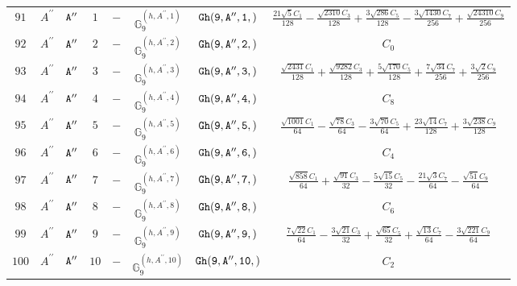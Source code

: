 \documentclass[fleqn,8pt]{jsarticle}
\begin{document}
\begin{table}[ht!]
\begin{center}
\begin{tabular}{cccccccc}
$ 91 $ & $ A^{\prime\prime} $ & $ {\tt A''} $ & $ 1 $ & $ - $ & $ \mathbb{G}_{9}^{(h,A^{\prime\prime},1)} $ & $ {\tt Gh(9,A'',1,)} $ & $ \frac{21 \sqrt{5} C_{1}}{128} - \frac{\sqrt{2310} C_{3}}{128} + \frac{3 \sqrt{286} C_{5}}{128} - \frac{3 \sqrt{1430} C_{7}}{256} + \frac{\sqrt{24310} C_{9}}{256} $ \\
$ 92 $ & $ A^{\prime\prime} $ & $ {\tt A''} $ & $ 2 $ & $ - $ & $ \mathbb{G}_{9}^{(h,A^{\prime\prime},2)} $ & $ {\tt Gh(9,A'',2,)} $ & $ C_{0} $ \\
$ 93 $ & $ A^{\prime\prime} $ & $ {\tt A''} $ & $ 3 $ & $ - $ & $ \mathbb{G}_{9}^{(h,A^{\prime\prime},3)} $ & $ {\tt Gh(9,A'',3,)} $ & $ \frac{\sqrt{2431} C_{1}}{128} + \frac{\sqrt{9282} C_{3}}{128} + \frac{5 \sqrt{170} C_{5}}{128} + \frac{7 \sqrt{34} C_{7}}{256} + \frac{3 \sqrt{2} C_{9}}{256} $ \\
$ 94 $ & $ A^{\prime\prime} $ & $ {\tt A''} $ & $ 4 $ & $ - $ & $ \mathbb{G}_{9}^{(h,A^{\prime\prime},4)} $ & $ {\tt Gh(9,A'',4,)} $ & $ C_{8} $ \\
$ 95 $ & $ A^{\prime\prime} $ & $ {\tt A''} $ & $ 5 $ & $ - $ & $ \mathbb{G}_{9}^{(h,A^{\prime\prime},5)} $ & $ {\tt Gh(9,A'',5,)} $ & $ \frac{\sqrt{1001} C_{1}}{64} - \frac{\sqrt{78} C_{3}}{64} - \frac{3 \sqrt{70} C_{5}}{64} + \frac{23 \sqrt{14} C_{7}}{128} + \frac{3 \sqrt{238} C_{9}}{128} $ \\
$ 96 $ & $ A^{\prime\prime} $ & $ {\tt A''} $ & $ 6 $ & $ - $ & $ \mathbb{G}_{9}^{(h,A^{\prime\prime},6)} $ & $ {\tt Gh(9,A'',6,)} $ & $ C_{4} $ \\
$ 97 $ & $ A^{\prime\prime} $ & $ {\tt A''} $ & $ 7 $ & $ - $ & $ \mathbb{G}_{9}^{(h,A^{\prime\prime},7)} $ & $ {\tt Gh(9,A'',7,)} $ & $ \frac{\sqrt{858} C_{1}}{64} + \frac{\sqrt{91} C_{3}}{32} - \frac{5 \sqrt{15} C_{5}}{32} - \frac{21 \sqrt{3} C_{7}}{64} - \frac{\sqrt{51} C_{9}}{64} $ \\
$ 98 $ & $ A^{\prime\prime} $ & $ {\tt A''} $ & $ 8 $ & $ - $ & $ \mathbb{G}_{9}^{(h,A^{\prime\prime},8)} $ & $ {\tt Gh(9,A'',8,)} $ & $ C_{6} $ \\
$ 99 $ & $ A^{\prime\prime} $ & $ {\tt A''} $ & $ 9 $ & $ - $ & $ \mathbb{G}_{9}^{(h,A^{\prime\prime},9)} $ & $ {\tt Gh(9,A'',9,)} $ & $ \frac{7 \sqrt{22} C_{1}}{64} - \frac{3 \sqrt{21} C_{3}}{32} + \frac{\sqrt{65} C_{5}}{32} + \frac{\sqrt{13} C_{7}}{64} - \frac{3 \sqrt{221} C_{9}}{64} $ \\
$ 100 $ & $ A^{\prime\prime} $ & $ {\tt A''} $ & $ 10 $ & $ - $ & $ \mathbb{G}_{9}^{(h,A^{\prime\prime},10)} $ & $ {\tt Gh(9,A'',10,)} $ & $ C_{2} $ \\
 \hline \hline
\end{tabular}
\end{center}
\end{table}
\end{document}
